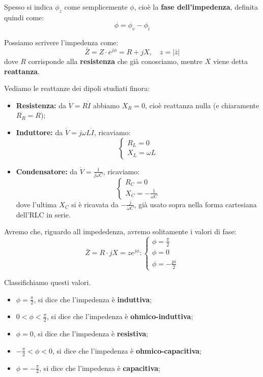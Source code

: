 \documentclass[a4paper,11pt]{article}
\begin{document}
Spesso si indica $\phi_z$ come semplicemente $\phi$, cioè la \textbf{fase dell'impedenza}, definita quindi come:
$$
\phi = \phi_v - \phi_i
$$

Possiamo scrivere l'impedenza come:
$$
\bar{Z} = Z \cdot e^{j \phi} = R + j X, \quad z = |\bar{z}|
$$
dove $R$ corrisponde alla \textbf{resistenza} che già conosciamo, mentre $X$ viene detta \textbf{reattanza}.

Vediamo le reattanze dei dipoli studiati finora:
\begin{itemize}
	\item \textbf{Resistenza:} da $\dot{V} = R \dot{I}$ abbiamo $X_R = 0$, cioè reattanza nulla (e chiaramente $R_R = R$);
	\item \textbf{Induttore:} da $\dot{V} = j \omega L \dot{I}$, ricaviamo:
		\[
			\begin{cases}
				R_L = 0	\\ 
				X_L = \omega L
			\end{cases}
		\]
	\item \textbf{Condensatore:} da $\dot{V} = \frac{1}{j \omega C}$, ricaviamo:
		\[
			\begin{cases}
				R_C = 0	\\ 
				X_C = -\frac{1}{\omega C}
			\end{cases}
		\]
		dove l'ultima $X_C$ si è ricavata da $-\frac{j}{\omega C}$, già usato sopra nella forma cartesiana dell'RLC in serie.
\end{itemize}

Avremo che, riguardo all impededenza, avremo solitamente i valori di fase:
$$
\bar{Z} = R \cdot j X = z e^{j \phi}:
	\begin{cases}
		\phi = \frac{\pi}{2} \\ 
		\phi = 0 \\ 
		\phi = -\frac{pi}{2}
	\end{cases}
$$

Classifichiamo questi valori.
\begin{itemize}
	\item $\phi = \frac{\pi}{2}$, si dice che l'impedenza è \textbf{induttiva};
	\item $0 < \phi < \frac{\pi}{2}$, si dice che l'impedenza è \textbf{ohmico-induttiva};
	\item $\phi = 0$, si dice che l'impedenza è \textbf{resistiva};
	\item $-\frac{\pi}{2} < \phi < 0$, si dice che l'impedenza è \textbf{ohmico-capacitiva}; 
	\item $\phi = -\frac{\pi}{2}$, si dice che l'impedenza è \textbf{capacitiva};
\end{itemize}
\end{document}
